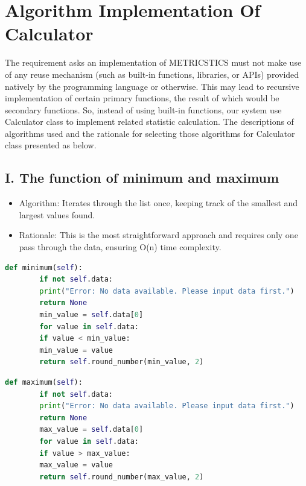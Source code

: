 \documentclass[english,12pt,a4paper]{report}
\begin{document}
	\section{Algorithm Implementation Of Calculator}
	The requirement asks an implementation of METRICSTICS must not make use of any reuse mechanism (such as built-in functions, libraries, or APIs) provided natively by the	programming language or otherwise. This may lead to recursive implementation of	certain primary functions, the result of which would be secondary functions. So, instead of using built-in functions, our system use Calculator class to implement related statistic calculation. The descriptions of algorithms used and the rationale for selecting those algorithms for Calculator class presented as below.
	
	\subsection*{I. The function of minimum and maximum}
	\begin{itemize}[leftmargin=*]
		\item Algorithm: Iterates through the list once, keeping track of the smallest and largest values found.
		\item Rationale: This is the most straightforward approach and requires only one pass through the data, ensuring O(n) time complexity.
	\end{itemize}
	\begin{lstlisting}[language=Python, caption=Minimum method]
		def minimum(self):
		if not self.data:
		print("Error: No data available. Please input data first.")
		return None
		min_value = self.data[0]
		for value in self.data:
		if value < min_value:
		min_value = value
		return self.round_number(min_value, 2)
	\end{lstlisting}
	
	\begin{lstlisting}[language=Python, caption=Maximum method]
		def maximum(self):
		if not self.data:
		print("Error: No data available. Please input data first.")
		return None
		max_value = self.data[0]
		for value in self.data:
		if value > max_value:
		max_value = value
		return self.round_number(max_value, 2)
	\end{lstlisting}
	
\end{document}
